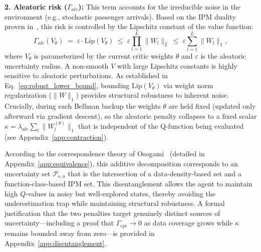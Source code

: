 \documentclass[10pt]{article}
\begin{document}
\textbf{2. Aleatoric risk ($\Gamma_{ale}$):} This term accounts for the irreducible noise in the environment (e.g., stochastic passenger arrivals). Based on the IPM duality proven in~\cite{Zhou2023NaturalActorCritic}, this risk is controlled by the Lipschitz constant of the value function:
\begin{equation}
    \label{eq:gamma_ale}
    \Gamma_{ale}(V_\theta) \;=\; \varepsilon \cdot \mathrm{Lip}(V_\theta)
    \;\le\; \varepsilon \prod_{l=1}^L \|W_l\|_2
    \;\le\; \varepsilon \sum_{l=1}^L \|W_l\|_1,
\end{equation}
where $V_\theta$ is parameterized by the current critic weights $\theta$ and $\varepsilon$ is the aleatoric uncertainty radius. A non-smooth $V$ with large Lipschitz constants is highly sensitive to aleatoric perturbations. As established in Eq.~\eqref{eq:robust_lower_bound}, bounding $\mathrm{Lip}(V_\theta)$ via weight norm regularization ($\|W\|_1$) provides structural robustness to inherent noise. Crucially, during each Bellman backup the weights $\theta$ are held fixed (updated only afterward via gradient descent), so the aleatoric penalty collapses to a fixed scalar $\kappa = \lambda_{ale}\sum_l \|W_l^{(\theta)}\|_1$ that is independent of the Q-function being evaluated (see Appendix~\ref{app:contraction}).

According to the correspondence theory of Osogami~\cite{Osogami2012Robustness} (detailed in Appendix~\ref{app:equivalence}), this additive decomposition corresponds to an uncertainty set $\mathcal{P}_{s,a}$ that is the intersection of a data-density-based set and a function-class-based IPM set. This disentanglement allows the agent to maintain high $Q$-values in noisy but well-explored states, thereby avoiding the underestimation trap while maintaining structural robustness. A formal justification that the two penalties target genuinely distinct sources of uncertainty---including a proof that $\Gamma_{epi}\to 0$ as data coverage grows while $\kappa$ remains bounded away from zero---is provided in Appendix~\ref{app:disentanglement}.
\end{document}
